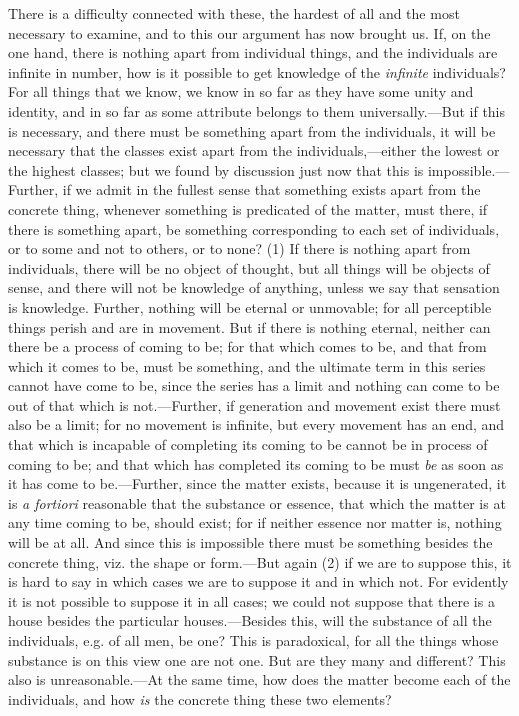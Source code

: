
There is a difficulty connected with these, the hardest of all and the most necessary to examine, and to this our argument has now brought us. If, on the one hand, there is nothing apart from individual things, and the individuals are infinite in number, how is it possible to get knowledge of the \emph{infinite} individuals? For all things that we know, we know in so far as they have some unity and identity, and in so far as some attribute belongs to them universally.—But if this is necessary, and there must be something apart from the individuals, it will be necessary that the classes exist apart from the individuals,—either the lowest or the highest classes; but we found by discussion just now that this is impossible.—Further, if we admit in the fullest sense that something exists apart from the concrete thing, whenever something is predicated of the matter, must there, if there is something apart, be something corresponding to each set of individuals, or to some and not to others, or to none? (1) If there is nothing apart from individuals, there will be no object of thought, but all things will be objects of sense, and there will not be knowledge of anything, unless we say that sensation is knowledge. Further, nothing will be eternal or unmovable; for all perceptible things perish and are in movement. But if there is nothing eternal, neither can there be a process of coming to be; for that which comes to be, and that from which it comes to be, must be something, and the ultimate term in this series cannot have come to be, since the series has a limit and nothing can come to be out of that which is not.—Further, if generation and movement exist there must also be a limit; for no movement is infinite, but every movement has an end, and that which is incapable of completing its coming to be cannot be in process of coming to be; and that which has completed its coming to be must \emph{be} as soon as it has come to be.—Further, since the matter exists, because it is ungenerated, it is \emph{a fortiori} reasonable that the substance or essence, that which the matter is at any time coming to be, should exist; for if neither essence nor matter is, nothing will be at all. And since this is impossible there must be something besides the concrete thing, viz. the shape or form.—But again (2) if we are to suppose this, it is hard to say in which cases we are to suppose it and in which not. For evidently it is not possible to suppose it in all cases; we could not suppose that there is a house besides the particular houses.—Besides this, will the substance of all the individuals, e.g. of all men, be one? This is paradoxical, for all the things whose substance is on this view one are not one. But are they many and different? This also is unreasonable.—At the same time, how does the matter become each of the individuals, and how \emph{is} the concrete thing these two elements?

